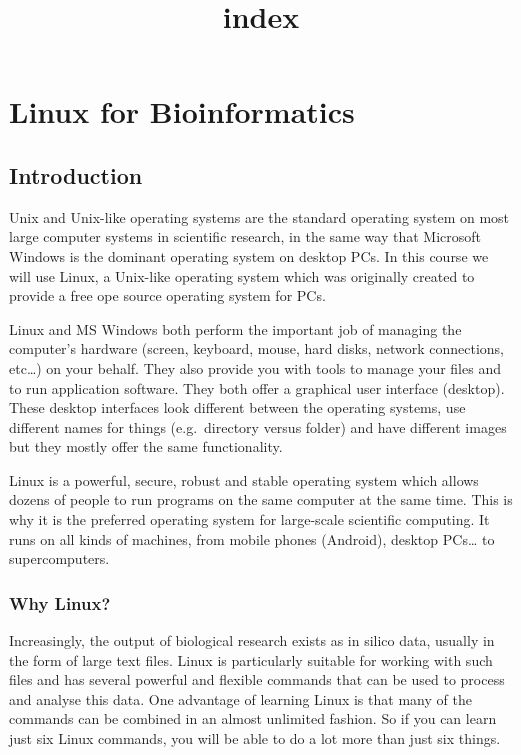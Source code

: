 \documentclass[11pt]{article}
\title{index}
\begin{document}
    \hypertarget{linux-for-bioinformatics}{%
\section{Linux for Bioinformatics}\label{linux-for-bioinformatics}}

\hypertarget{introduction}{%
\subsection{Introduction}\label{introduction}}

Unix and Unix-like operating systems are the standard operating system
on most large computer systems in scientific research, in the same way
that Microsoft Windows is the dominant operating system on desktop PCs.
In this course we will use Linux, a Unix-like operating system which was
originally created to provide a free ope source operating system for
PCs.

Linux and MS Windows both perform the important job of managing the
computer's hardware (screen, keyboard, mouse, hard disks, network
connections, etc\ldots) on your behalf. They also provide you with tools
to manage your files and to run application software. They both offer a
graphical user interface (desktop). These desktop interfaces look
different between the operating systems, use different names for things
(e.g.~directory versus folder) and have different images but they mostly
offer the same functionality.

Linux is a powerful, secure, robust and stable operating system which
allows dozens of people to run programs on the same computer at the same
time. This is why it is the preferred operating system for large-scale
scientific computing. It runs on all kinds of machines, from mobile
phones (Android), desktop PCs\ldots{} to supercomputers.

\hypertarget{why-linux}{%
\subsubsection{Why Linux?}\label{why-linux}}

Increasingly, the output of biological research exists as in silico
data, usually in the form of large text files. Linux is particularly
suitable for working with such files and has several powerful and
flexible commands that can be used to process and analyse this data. One
advantage of learning Linux is that many of the commands can be combined
in an almost unlimited fashion. So if you can learn just six Linux
commands, you will be able to do a lot more than just six things.
\end{document}
